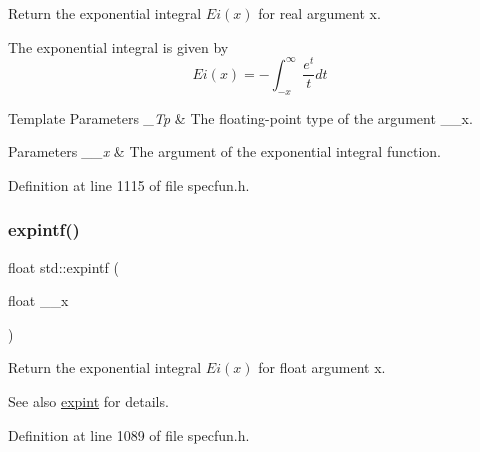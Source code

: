 Return the exponential integral $ Ei(x) $ for {\ttfamily real} argument {\ttfamily x}.

The exponential integral is given by \[ Ei(x) = -\int_{-x}^\infty \frac{e^t}{t} dt \]


\begin{DoxyTemplParams}{Template Parameters}
{\em \+\_\+\+Tp} & The floating-\/point type of the argument {\ttfamily \+\_\+\+\_\+x}. \\
\hline
\end{DoxyTemplParams}

\begin{DoxyParams}{Parameters}
{\em \+\_\+\+\_\+x} & The argument of the exponential integral function. \\
\hline
\end{DoxyParams}


Definition at line 1115 of file specfun.\+h.

\mbox{\label{group__mathsf__std_ga5842816f6eed2594e0a327df4e4a2a47}} 
\subsubsection{\texorpdfstring{expintf()}{expintf()}}
{\footnotesize\ttfamily float std\+::expintf (\begin{DoxyParamCaption}\item[{float}]{\+\_\+\+\_\+x }\end{DoxyParamCaption})\hspace{0.3cm}{\ttfamily [inline]}}

Return the exponential integral $ Ei(x) $ for {\ttfamily float} argument {\ttfamily x}.

\begin{DoxySeeAlso}{See also}
\hyperlink{group__mathsf__std_ga0e9ac717a106ef54184b5f058c451782}{expint} for details. 
\end{DoxySeeAlso}


Definition at line 1089 of file specfun.\+h.

\mbox{\label{group__mathsf__std_ga1329130b32328d0666e290ee5931fa4f}} 
